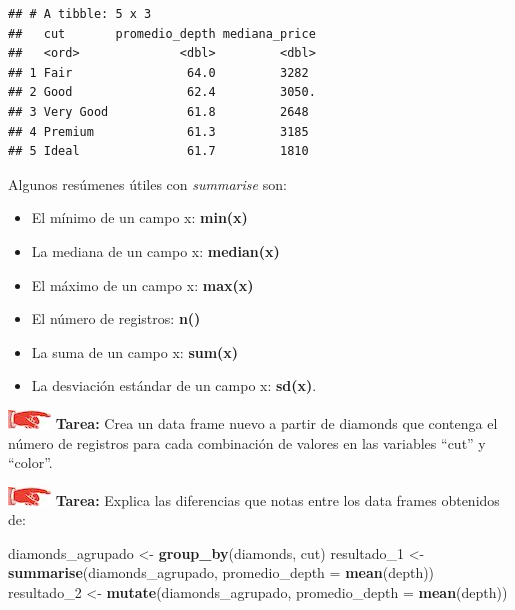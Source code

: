 \documentclass[]{book}
\newenvironment{Shaded}{\begin{snugshade}}{\end{snugshade}}
\newcommand{\KeywordTok}[1]{\textcolor[rgb]{0.13,0.29,0.53}{\textbf{#1}}}
\newcommand{\DataTypeTok}[1]{\textcolor[rgb]{0.13,0.29,0.53}{#1}}
\newcommand{\DecValTok}[1]{\textcolor[rgb]{0.00,0.00,0.81}{#1}}
\newcommand{\StringTok}[1]{\textcolor[rgb]{0.31,0.60,0.02}{#1}}
\newcommand{\NormalTok}[1]{#1}
\providecommand{\tightlist}{%
  \setlength{\itemsep}{0pt}\setlength{\parskip}{0pt}}
\theoremstyle{definition}
\theoremstyle{definition}
\theoremstyle{definition}
\theoremstyle{remark}
\begin{document}
\begin{verbatim}
## # A tibble: 5 x 3
##   cut       promedio_depth mediana_price
##   <ord>              <dbl>         <dbl>
## 1 Fair                64.0         3282 
## 2 Good                62.4         3050.
## 3 Very Good           61.8         2648 
## 4 Premium             61.3         3185 
## 5 Ideal               61.7         1810
\end{verbatim}

Algunos resúmenes útiles con \emph{summarise} son:

\begin{itemize}
\tightlist
\item
  El mínimo de un campo x: \textbf{min(x)}
\item
  La mediana de un campo x: \textbf{median(x)}
\item
  El máximo de un campo x: \textbf{max(x)}
\item
  El número de registros: \textbf{n()}
\item
  La suma de un campo x: \textbf{sum(x)}
\item
  La desviación estándar de un campo x: \textbf{sd(x)}.
\end{itemize}

\includegraphics{./imagenes/manicule.jpg} \textbf{Tarea:} Crea un data
frame nuevo a partir de diamonds que contenga el número de registros
para cada combinación de valores en las variables ``cut'' y ``color''.

\includegraphics{./imagenes/manicule.jpg} \textbf{Tarea:} Explica las
diferencias que notas entre los data frames obtenidos de:

\begin{Shaded}
\begin{Highlighting}[]
\NormalTok{diamonds_agrupado <-}\StringTok{ }\KeywordTok{group_by}\NormalTok{(diamonds, cut)}
\NormalTok{resultado_}\DecValTok{1}\NormalTok{ <-}\StringTok{ }\KeywordTok{summarise}\NormalTok{(diamonds_agrupado, }\DataTypeTok{promedio_depth =} \KeywordTok{mean}\NormalTok{(depth))}
\NormalTok{resultado_}\DecValTok{2}\NormalTok{ <-}\StringTok{ }\KeywordTok{mutate}\NormalTok{(diamonds_agrupado, }\DataTypeTok{promedio_depth =} \KeywordTok{mean}\NormalTok{(depth))}
\end{Highlighting}
\end{Shaded}
\end{document}
